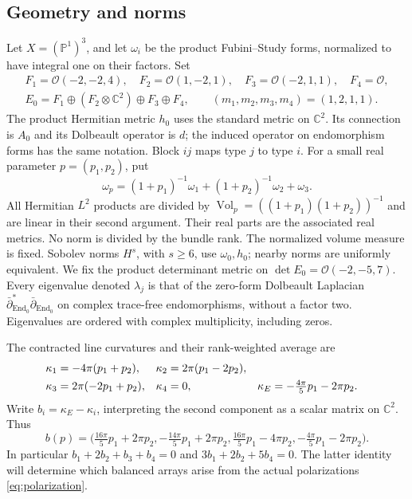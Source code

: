 \documentclass[11pt]{amsart}
\theoremstyle{definition}
\theoremstyle{remark}
\newcommand{\CC}{\mathbb C}
\newcommand{\PP}{\mathbb P}
\newcommand{\cO}{\mathcal O}
\newcommand{\Vol}{\operatorname{Vol}}
\newcommand{\End}{\operatorname{End}}
\begin{document}
\subsection{Geometry and norms}
Let $X=(\PP^1)^3$, and let $\omega_i$ be the product Fubini--Study
forms, normalized to have integral one on their factors. Set
\begin{gather}
 F_1=\cO(-2,-2,4),\quad F_2=\cO(1,-2,1),\quad
 F_3=\cO(-2,1,1),\quad F_4=\cO,\label{eq:lines}\\
 E_0=F_1\oplus(F_2\otimes\CC^2)\oplus F_3\oplus F_4,
 \qquad (m_1,m_2,m_3,m_4)=(1,2,1,1).\label{eq:split-bundle}
\end{gather}
The product Hermitian metric $h_0$ uses the standard metric on $\CC^2$.
Its connection is $A_0$ and its Dolbeault operator is $d$; the induced
operator on endomorphism forms has the same notation. Block $ij$ maps
type $j$ to type $i$. For a small real parameter $p=(p_1,p_2)$, put
\begin{equation}\label{eq:polarization}
 \omega_p=(1+p_1)^{-1}\omega_1+(1+p_2)^{-1}\omega_2+\omega_3.
\end{equation}
All Hermitian $L^2$ products are divided by
$\Vol_p=((1+p_1)(1+p_2))^{-1}$ and are linear in their second
argument. Their real parts are the associated real metrics. No norm
is divided by the bundle rank. The normalized volume measure is fixed.
Sobolev norms $H^s$, with $s\ge6$, use $\omega_0,h_0$; nearby norms
are uniformly equivalent. We fix the product determinant metric on
$\det E_0=\cO(-2,-5,7)$.
Every eigenvalue denoted $\lambda_j$ is that of the zero-form
Dolbeault Laplacian $\bar\partial_{\End_0}^*\bar\partial_{\End_0}$
on complex trace-free endomorphisms, without a factor two.
Eigenvalues are ordered with complex multiplicity, including zeros.

The contracted line curvatures and their rank-weighted average are
\begin{align}
 \kappa_1&=-4\pi(p_1+p_2),&\kappa_2&=2\pi(p_1-2p_2),\notag\\
 \kappa_3&=2\pi(-2p_1+p_2),&\kappa_4&=0,
 &\kappa_E&=-\tfrac{4\pi}{5}p_1-2\pi p_2.\label{eq:curvatures}
\end{align}
Write $b_i=\kappa_E-\kappa_i$, interpreting the second component as a
scalar matrix on $\CC^2$. Thus
\begin{equation}\label{eq:slopes}
 b(p)=\bigl(\tfrac{16\pi}{5}p_1+2\pi p_2,
 -\tfrac{14\pi}{5}p_1+2\pi p_2,
 \tfrac{16\pi}{5}p_1-4\pi p_2,
 -\tfrac{4\pi}{5}p_1-2\pi p_2\bigr).
\end{equation}
In particular $b_1+2b_2+b_3+b_4=0$ and $3b_1+2b_2+5b_4=0$.
The latter identity will determine which balanced arrays arise from
the actual polarizations \eqref{eq:polarization}.
\end{document}
